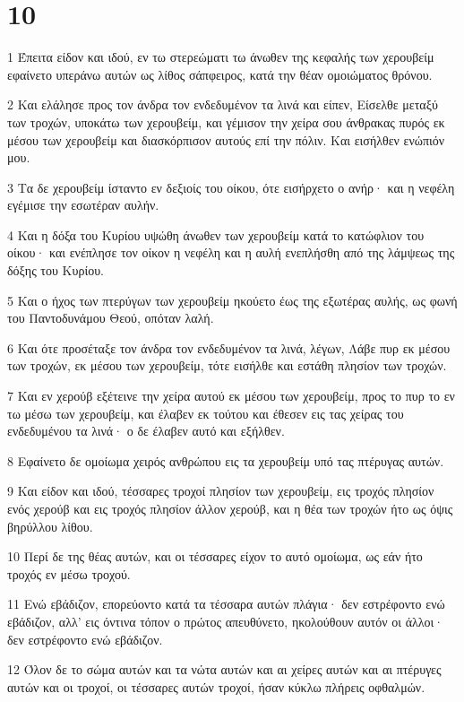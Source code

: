 \chapter{10}

\par 1 Έπειτα είδον και ιδού, εν τω στερεώματι τω άνωθεν της κεφαλής των χερουβείμ εφαίνετο υπεράνω αυτών ως λίθος σάπφειρος, κατά την θέαν ομοιώματος θρόνου.
\par 2 Και ελάλησε προς τον άνδρα τον ενδεδυμένον τα λινά και είπεν, Είσελθε μεταξύ των τροχών, υποκάτω των χερουβείμ, και γέμισον την χείρα σου άνθρακας πυρός εκ μέσου των χερουβείμ και διασκόρπισον αυτούς επί την πόλιν. Και εισήλθεν ενώπιόν μου.
\par 3 Τα δε χερουβείμ ίσταντο εν δεξιοίς του οίκου, ότε εισήρχετο ο ανήρ· και η νεφέλη εγέμισε την εσωτέραν αυλήν.
\par 4 Και η δόξα του Κυρίου υψώθη άνωθεν των χερουβείμ κατά το κατώφλιον του οίκου· και ενέπλησε τον οίκον η νεφέλη και η αυλή ενεπλήσθη από της λάμψεως της δόξης του Κυρίου.
\par 5 Και ο ήχος των πτερύγων των χερουβείμ ηκούετο έως της εξωτέρας αυλής, ως φωνή του Παντοδυνάμου Θεού, οπόταν λαλή.
\par 6 Και ότε προσέταξε τον άνδρα τον ενδεδυμένον τα λινά, λέγων, Λάβε πυρ εκ μέσου των τροχών, εκ μέσου των χερουβείμ, τότε εισήλθε και εστάθη πλησίον των τροχών.
\par 7 Και εν χερούβ εξέτεινε την χείρα αυτού εκ μέσου των χερουβείμ, προς το πυρ το εν τω μέσω των χερουβείμ, και έλαβεν εκ τούτου και έθεσεν εις τας χείρας του ενδεδυμένου τα λινά· ο δε έλαβεν αυτό και εξήλθεν.
\par 8 Εφαίνετο δε ομοίωμα χειρός ανθρώπου εις τα χερουβείμ υπό τας πτέρυγας αυτών.
\par 9 Και είδον και ιδού, τέσσαρες τροχοί πλησίον των χερουβείμ, εις τροχός πλησίον ενός χερούβ και εις τροχός πλησίον άλλον χερούβ, και η θέα των τροχών ήτο ως όψις βηρύλλου λίθου.
\par 10 Περί δε της θέας αυτών, και οι τέσσαρες είχον το αυτό ομοίωμα, ως εάν ήτο τροχός εν μέσω τροχού.
\par 11 Ενώ εβάδιζον, επορεύοντο κατά τα τέσσαρα αυτών πλάγια· δεν εστρέφοντο ενώ εβάδιζον, αλλ' εις όντινα τόπον ο πρώτος απευθύνετο, ηκολούθουν αυτόν οι άλλοι· δεν εστρέφοντο ενώ εβάδιζον.
\par 12 Όλον δε το σώμα αυτών και τα νώτα αυτών και αι χείρες αυτών και αι πτέρυγες αυτών και οι τροχοί, οι τέσσαρες αυτών τροχοί, ήσαν κύκλω πλήρεις οφθαλμών.
